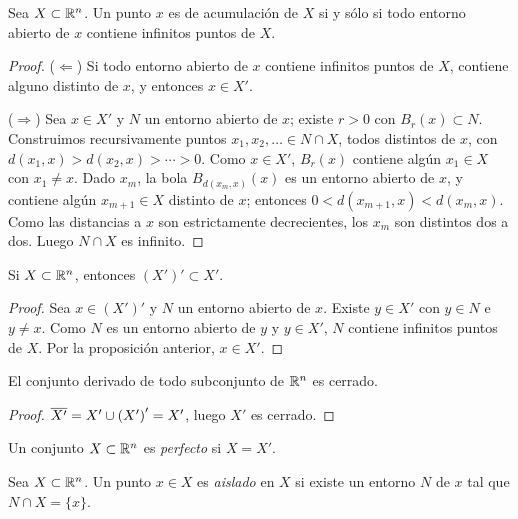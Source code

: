 \begin{prop}
  Sea \(X \subset \mathbb{R}^n\). Un punto \(x\) es de acumulación de \(X\) si y sólo si todo entorno abierto de \(x\) contiene infinitos puntos de \(X\).
\end{prop}

\begin{proof}
  (\(\Leftarrow\)) Si todo entorno abierto de \(x\) contiene infinitos puntos de \(X\), contiene alguno distinto de \(x\), y entonces \(x \in X'\).

  (\(\Rightarrow\)) Sea \(x \in X'\) y \(N\) un entorno abierto de \(x\); existe \(r > 0\) con \(B_r(x) \subset N\). Construimos recursivamente puntos \(x_1, x_2, \dots \in N \cap X\), todos distintos de \(x\), con \(d(x_1, x) > d(x_2, x) > \cdots > 0\). Como \(x \in X'\), \(B_r(x)\) contiene algún \(x_1 \in X\) con \(x_1 \neq x\). Dado \(x_m\), la bola \(B_{d(x_m, x)}(x)\) es un entorno abierto de \(x\), y contiene algún \(x_{m+1} \in X\) distinto de \(x\); entonces \(0 < d(x_{m+1}, x) < d(x_m, x)\). Como las distancias a \(x\) son estrictamente decrecientes, los \(x_m\) son distintos dos a dos. Luego \(N \cap X\) es infinito.
\end{proof}

\begin{prop}
  Si \(X \subset \mathbb{R}^n\), entonces \({(X')}' \subset X'\).
\end{prop}

\begin{proof}
  Sea \(x \in {(X')}'\) y \(N\) un entorno abierto de \(x\). Existe \(y \in X'\) con \(y \in N\) e \(y \neq x\). Como \(N\) es un entorno abierto de \(y\) y \(y \in X'\), \(N\) contiene infinitos puntos de \(X\). Por la proposición anterior, \(x \in X'\).
\end{proof}

\begin{corollary}
  El conjunto derivado de todo subconjunto de \(\mathbb{R}^n\) es cerrado.
\end{corollary}

\begin{proof}
  \(\overline{X'} = X' \cup {(X')}' = X'\), luego \(X'\) es cerrado.
\end{proof}

\begin{definition}
  Un conjunto \(X \subset \mathbb{R}^n\) es \emph{perfecto} si \(X = X'\).
\end{definition}

\begin{definition}
  Sea \(X \subset \mathbb{R}^n\). Un punto \(x \in X\) es \emph{aislado} en \(X\) si existe un entorno \(N\) de \(x\) tal que \(N \cap X = \{x\}\).
\end{definition}

